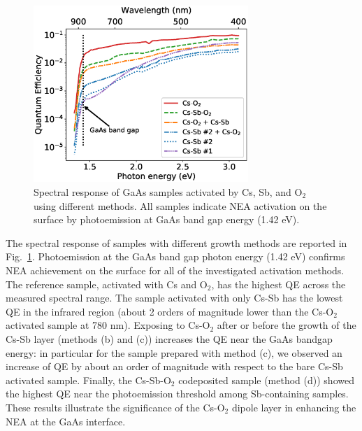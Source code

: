
\begin{figure}
	\centering
	\includegraphics*[width=230pt]{figs/CsSbO/sr.eps}
	\caption{Spectral response of GaAs samples activated by Cs, Sb, and O$_2$ using different methods. All samples indicate NEA activation on the surface by photoemission at GaAs band gap energy (1.42 eV).
	}
	\label{fig_sr}
\end{figure}

The spectral response of samples with different growth methods are reported in Fig.~\ref{fig_sr}. %
Photoemission at the GaAs band gap photon energy (1.42 eV) confirms NEA achievement on the surface for all of the investigated activation methods. The reference sample, activated with Cs and O$_2$, has the highest QE across the measured spectral range. The sample activated with only Cs-Sb has the lowest QE in the infrared region (about 2 orders of magnitude lower than the Cs-O$_2$ activated sample at 780 nm). Exposing to Cs-O$_2$ after or before the growth of the Cs-Sb layer (methods (b) and (c)) increases the QE near the GaAs bandgap energy: in particular for the sample prepared with method (c), we observed an increase of QE by about an order of magnitude with respect to the bare Cs-Sb activated sample. Finally, the Cs-Sb-O$_2$ codeposited sample (method (d)) showed the highest QE near the photoemission threshold among Sb-containing samples. These results illustrate the significance of the Cs-O$_2$ dipole layer in enhancing the NEA at the GaAs interface.

